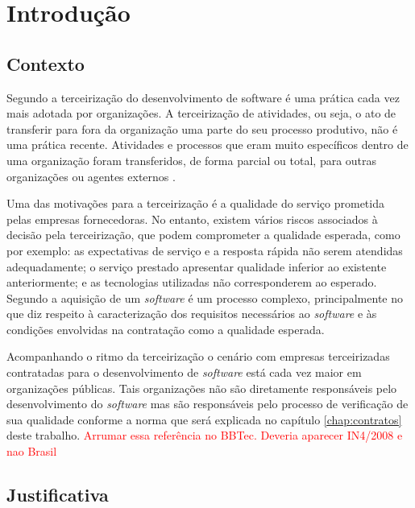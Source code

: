 \chapter{Introdução}
\label{chap:introdução} 

\section{Contexto}

Segundo\cite{WillcocksTercerizacao} a terceirização do desenvolvimento de software é uma prática cada vez mais adotada por organizações. A terceirização de atividades, ou seja, o ato de transferir para fora da organização uma parte do seu processo produtivo, não é uma prática recente. Atividades e processos que eram muito específicos dentro de uma organização foram transferidos, de forma parcial ou total, para outras organizações ou agentes externos \cite{leite_terceirizacao}.

Uma das motivações para a terceirização é a qualidade do serviço prometida pelas empresas fornecedoras. No entanto, existem vários riscos associados à decisão pela terceirização, que podem comprometer a qualidade esperada, como por exemplo: as expectativas de serviço e a resposta rápida não serem atendidas adequadamente; o serviço prestado apresentar qualidade inferior ao existente anteriormente; e as tecnologias utilizadas não corresponderem ao esperado\cite{WillcocksTercerizacao}. Segundo  a aquisição de um \textit {software} é um processo complexo, principalmente no que diz respeito à caracterização dos requisitos necessários ao \textit {software} e às condições envolvidas na contratação como a qualidade esperada. 
 
Acompanhando o ritmo da terceirização o cenário com empresas terceirizadas contratadas para o desenvolvimento de \textit {software} está cada vez maior em organizações públicas. Tais organizações não são diretamente responsáveis pelo desenvolvimento do \textit {software} mas são responsáveis  pelo processo de verificação de sua qualidade conforme a norma \cite{Normativa4} que será explicada no capítulo \ref{chap:contratos} deste trabalho. \textcolor{red}{Arrumar essa referência no BBTec. Deveria aparecer IN4/2008 e nao Brasil}




\section{Justificativa}

